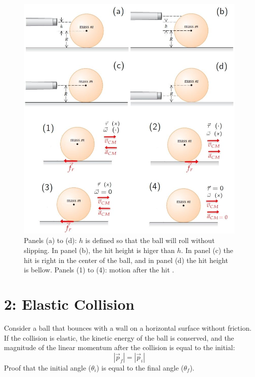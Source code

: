 \documentclass[12pt]{article}
\begin{document}
\begin{figure}[h!]
  \centering
  \includegraphics[width=1.\textwidth]{images/ball_a.jpg}
  \caption{Panels (a) to (d): $h$ is defined so that the ball will roll without slipping. In panel (b), the hit 
  height is higer than $h$. In panel (c) the hit is right in the center of the ball, and in panel (d) the hit height is bellow. Panels (1) to (4): motion after the hit .}
  \label{fig:1}
\end{figure}

\vspace{14mm}

\newpage



\section*{2: Elastic Collision}

 Consider a ball that bounces with a wall on a horizontal surface without friction. If the collision is elastic,
the kinetic energy of the ball is conserved, and the magnitude of the linear momentum after the collision is equal to the initial:
\begin{equation}
    |\vec{p}_f|=|\vec{p}_i|
\end{equation}
Proof that the initial angle ($\theta_i$) is equal to the final angle ($\theta_f$). 
\vspace{7mm}
\end{document}
